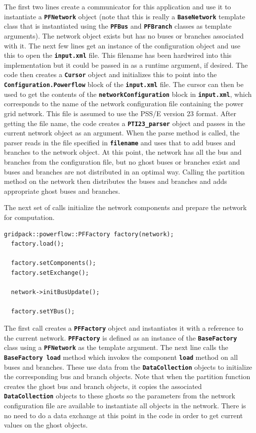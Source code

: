 The first two lines create a communicator for this application and use it to instantiate a \texttt{\textbf{PFNetwork}} object (note that this is really a \texttt{\textbf{BaseNetwork}} template class that is instantiated using the \texttt{\textbf{PFBus}} and \texttt{\textbf{PFBranch}} classes as template arguments). The network object exists but has no buses or branches associated with it. The next few lines get an instance of the configuration object and use this to open the \texttt{\textbf{input.xml}} file. This filename has been hardwired into this implementation but it could be passed in as a runtime argument, if desired. The code then creates a \texttt{\textbf{Cursor}} object and initializes this to point into the \texttt{\textbf{Configuration.Powerflow}} block of the \texttt{\textbf{input.xml}} file. The cursor can then be used to get the contents of the \texttt{\textbf{networkConfiguration}} block in \texttt{\textbf{input.xml}}, which corresponds to the name of the network configuration file containing the power grid network. This file is assumed to use the PSS/E version 23 format. After getting the file name, the code creates a \texttt{\textbf{PTI23\_parser}} object and passes in the current network object as an argument. When the parse method is called, the parser reads in the file specified in \texttt{\textbf{filename}} and uses that to add buses and branches to the network object. At this point, the network has all the bus and branches from the configuration file, but no ghost buses or branches exist and buses and branches are not distributed in an optimal way. Calling the partition method on the network then distributes the buses and branches and adds appropriate ghost buses and branches.

The next set of calls initialize the network components and prepare the network for computation.

{
\color{red}
\begin{Verbatim}[fontseries=b]
  gridpack::powerflow::PFFactory factory(network);
  factory.load();

  factory.setComponents();
  factory.setExchange();
  
  network->initBusUpdate();

  factory.setYBus();
\end{Verbatim}
}

The first call creates a \texttt{\textbf{PFFactory}} object and instantiates it with a reference to the current network. \texttt{\textbf{PFFactory}} is defined as an instance of the \texttt{\textbf{BaseFactory}} class using a \texttt{\textbf{PFNetwork}} as the template argument. The next line calls the \texttt{\textbf{BaseFactory load}} method which invokes the component \texttt{\textbf{load}} method on all buses and branches. These use data from the \texttt{\textbf{DataCollection}} objects to initialize the corresponding bus and branch objects. Note that when the partition function creates the ghost bus and branch objects, it copies the associated \texttt{\textbf{DataCollection}} objects to these ghosts so the parameters from the network configuration file are available to instantiate all objects in the network. There is no need to do a data exchange at this point in the code in order to get current values on the ghost objects.

